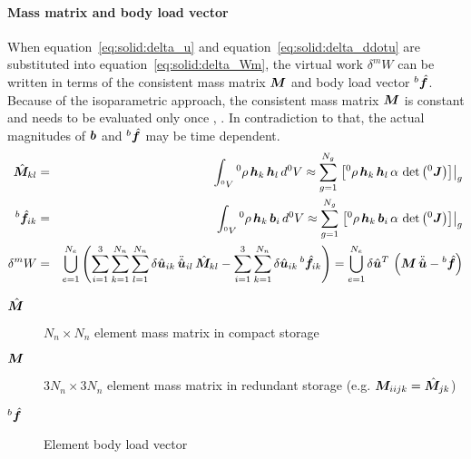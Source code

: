 \paragraph{Mass matrix and body load vector}
When equation~\ref{eq:solid:delta_u} and equation~\ref{eq:solid:delta_ddotu} are substituted into equation~\ref{eq:solid:delta_Wm},
the virtual work $\delta^mW$ can be written in terms of the consistent mass matrix $\bm{M}$ and body load vector $^b\hat{\bm{f}}$.
Because of the isoparametric approach, the consistent mass matrix $\bm{M}$ is constant and needs to be evaluated only once \cite{BATHE2016}, \cite{KUEBLER2005}.
In contradiction to that, the actual magnitudes of $\bm{b}$ and $^b\hat{\bm{f}}$ may be time dependent.
\begin{eqnarray}
\hat{\bm{M}}_{kl} & = & \int_{^0V} {^0}\rho \, \bm{h}_k \, \bm{h}_l \, d^0V \approx \sum_{g=1}^{N_g} \left.\left[{^0}\rho \, \bm{h}_k \, \bm{h}_l \, \alpha \, \det{\left({^0}\bm{J}\right)}\right]\right\vert_{g} \\
{^b}\hat{\bm{f}}_{ik} & = & \int_{^0V} {^0}\rho \, \bm{h}_k \, \bm{b}_i \, d^0V \approx \sum_{g=1}^{N_g} \left.\left[{^0}\rho \, \bm{h}_k \, \bm{b}_i \, \alpha \, \det{\left({^0}\bm{J}\right)}\right]\right\vert_{g} \\
\delta^{m}W & = & \bigcup_{e=1}^{N_e}\left(\sum_{i=1}^3\sum_{k=1}^{N_n}\sum_{l=1}^{N_n} \delta\hat{\bm{u}}_{ik} \, \ddot{\hat{\bm{u}}}_{il} \, \hat{\bm{M}}_{kl}
 - \sum_{i=1}^3\sum_{k=1}^{N_n} \delta\hat{\bm{u}}_{ik} \, {^b}\hat{\bm{f}}_{ik}\right) = \bigcup_{e=1}^{N_e} \delta\hat{\bm{u}}^T \, \left(\bm{M} \, \ddot{\hat{\bm{u}}} - {^b}\hat{\bm{f}} \right)
\end{eqnarray}
\begin{description}
\item[$\hat{\bm{M}}$] $N_n\times N_n$ element mass matrix in compact storage
\item[$\bm{M}$] $3 N_n \times 3 N_n$ element mass matrix in redundant storage (e.g. $\bm{M}_{iijk} = \hat{\bm{M}}_{jk}$)
\item[${^b}\hat{\bm{f}}$] Element body load vector
\end{description}

